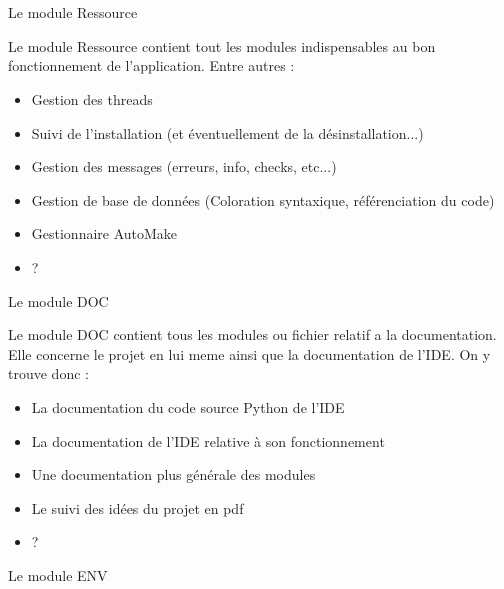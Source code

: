 \documentclass[a4paper,12pt]{article}
\author{\begin{flushleft}Eté Rémi\end{flushleft}}
\date\today
\begin{document}

~\\
~\\


\begin{center}
{\LARGE Le module Ressource}
\end{center}

Le module Ressource contient tout les modules indispensables au bon fonctionnement de l'application.
Entre autres :
\begin{itemize}
\item Gestion des threads
\item Suivi de l'installation (et éventuellement de la désinstallation...)
\item Gestion des messages (erreurs, info, checks, etc...)
\item Gestion de base de données (Coloration syntaxique, référenciation du code)
\item Gestionnaire AutoMake
\item ?
\end{itemize}


\begin{center}
{\LARGE Le module DOC}
\end{center}

Le module DOC contient tous les modules ou fichier relatif a la documentation. Elle concerne le projet en lui meme ainsi que la documentation de l'IDE. On y trouve donc :
\begin{itemize}
\item La documentation du code source Python de l'IDE
\item La documentation de l'IDE relative à son fonctionnement
\item Une documentation plus générale des modules
\item Le suivi des idées du projet en pdf
\item ?
\end{itemize}


\begin{center}
{\LARGE Le module ENV}
\end{center}
\end{document}

